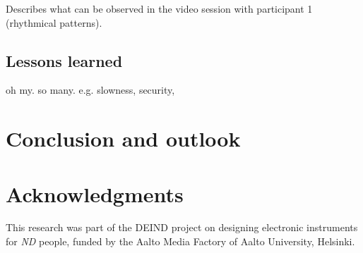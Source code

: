 \documentclass{chi-ext}
\begin{document}
\begin{multicols}{2}
Describes what can be observed in the video session with participant 1 (rhythmical patterns).

\subsection{Lessons learned}
\label{sub:lessons_learned}

oh my. so many.
e.g. 
slowness,
security,


\section{Conclusion and outlook}
\label{sec:conclusion_and_outlook}




\section{Acknowledgments}
This research was part of the DEIND project on designing electronic instruments for \emph{ND} people, funded by the Aalto Media Factory of Aalto University, Helsinki.  


~\nocite{cappelen2012-mus,herstad2012-wha,herstad2012-mak,green2011agility,kleimola2011-vec,kleimola2010-fee,parker2011-a-s,parker2010-mod,valimaki2010-par,straus2011-ext,hegarty2006-noi,gurevich2007expression,burrows2010choreographer,bown2009understanding,jaarsma2012autism,hammel2011teaching,fard2012-wit,baggs2007-in,sinclair1993-don,wishart1994-aud,headlam2006-lea,2006-sou,campo2009-microsound,campo2009-the,m.-baalman2009-the,campo2008-objMod,wcd2011-scbook}



 

\end{multicols}
\end{document}
